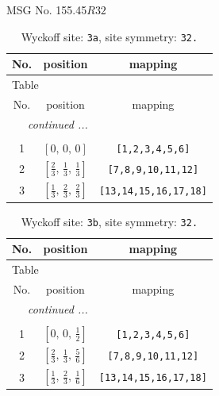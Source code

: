 \documentclass[fleqn,8pt]{jsarticle}
\begin{document}
\setcounter{MaxMatrixCols}{32}

\renewcommand{\tablename}{Table~}
\renewcommand{\figurename}{Figure~}
\begin{center}
\LARGE
MSG No. 155.45\quad$R32$
\end{center}
\renewcommand{\arraystretch}{1.2}
\begin{longtable}{ccc}
\caption{Wyckoff site: {\tt 3a}, site symmetry: {\tt 32.}}
 \\
 \hline \hline
No. & position & mapping \\ \hline \endfirsthead

\multicolumn{2}{l}{\tablename\ \thetable{}} \\
 \hline \hline
No. & position & mapping \\ \hline \endhead

 \hline \hline
\multicolumn{2}{r}{\footnotesize\it continued ...} \\ \endfoot

 \hline \hline
\multicolumn{2}{r}{} \\ \endlastfoot

1 & $\left[ 0,\, 0,\, 0 \right]$ & {\tt [1,2,3,4,5,6]} \\ \hline
2 & $\left[ \frac{2}{3},\, \frac{1}{3},\, \frac{1}{3} \right]$ & {\tt [7,8,9,10,11,12]} \\ \hline
3 & $\left[ \frac{1}{3},\, \frac{2}{3},\, \frac{2}{3} \right]$ & {\tt [13,14,15,16,17,18]} \\
\end{longtable}
\renewcommand{\arraystretch}{1.2}
\begin{longtable}{ccc}
\caption{Wyckoff site: {\tt 3b}, site symmetry: {\tt 32.}}
 \\
 \hline \hline
No. & position & mapping \\ \hline \endfirsthead

\multicolumn{2}{l}{\tablename\ \thetable{}} \\
 \hline \hline
No. & position & mapping \\ \hline \endhead

 \hline \hline
\multicolumn{2}{r}{\footnotesize\it continued ...} \\ \endfoot

 \hline \hline
\multicolumn{2}{r}{} \\ \endlastfoot

1 & $\left[ 0,\, 0,\, \frac{1}{2} \right]$ & {\tt [1,2,3,4,5,6]} \\ \hline
2 & $\left[ \frac{2}{3},\, \frac{1}{3},\, \frac{5}{6} \right]$ & {\tt [7,8,9,10,11,12]} \\ \hline
3 & $\left[ \frac{1}{3},\, \frac{2}{3},\, \frac{1}{6} \right]$ & {\tt [13,14,15,16,17,18]} \\
\end{longtable}
\end{document}
